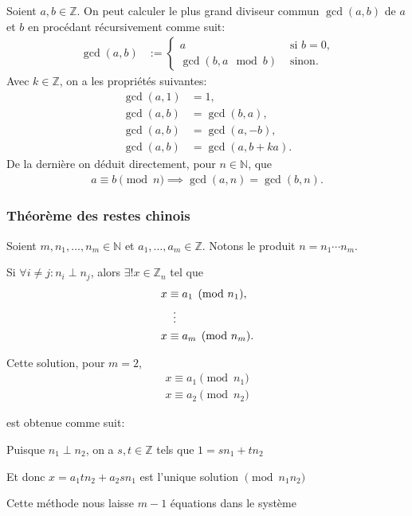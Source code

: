 \documentclass{article}
\begin{document}
Soient $a, b \in \mathbb{Z}$. On peut calculer le plus grand diviseur commun $\gcd(a, b)$ de $a$ et $b$ en procédant récursivement comme suit:
\begin{align*}
    \gcd(a, b) & := \begin{cases}
        a & \text{ si $b = 0$,} \\
        \gcd(b, a \mod b) & \text{ sinon.}
    \end{cases}
\end{align*}
Avec $k \in \mathbb{Z}$, on a les propriétés suivantes:
\begin{align*}
    \gcd(a, 1) & = 1, \\
    \gcd(a, b) & = \gcd(b, a), \\
    \gcd(a, b) &= \gcd(a, -b), \\
    \gcd(a, b) & = \gcd(a, b + ka).
\end{align*}
De la dernière on déduit directement, pour $n \in \mathbb{N}$, que
\begin{align*}
        a \equiv b \pmod n \implies \gcd(a, n) = \gcd(b, n).
\end{align*}

\subsubsection{Théorème des restes chinois}

Soient $m, n_1, \dots, n_m \in \mathbb{N}$ et $a_1, \dots, a_m \in \mathbb{Z}$. Notons le produit $n = n_1 \cdots n_m$.

Si $\forall i \neq j : n_i \perp n_j$, alors $\exists!x \in \mathbb{Z}_n$ tel que
\begin{align*}
    x &\equiv a_1 \pmod {n_1}, \\
    &\vdotswithin{\equiv} \\
    x &\equiv a_m \pmod {n_m}.
\end{align*}

Cette solution, pour $m = 2$,
\begin{align*}
    x \equiv a_1 \pmod {n_1} \\
    x \equiv a_2 \pmod {n_2}
\end{align*}

est obtenue comme suit:

Puisque $n_1 \perp n_2$, on a $s, t \in \mathbb{Z}$ tels que $1 = sn_1 + tn_2$

Et donc $x = a_1tn_2 + a_2sn_1$ est l'unique solution $\pmod {n_1n_2}$

Cette méthode nous laisse $m - 1$ équations dans le système
\end{document}
